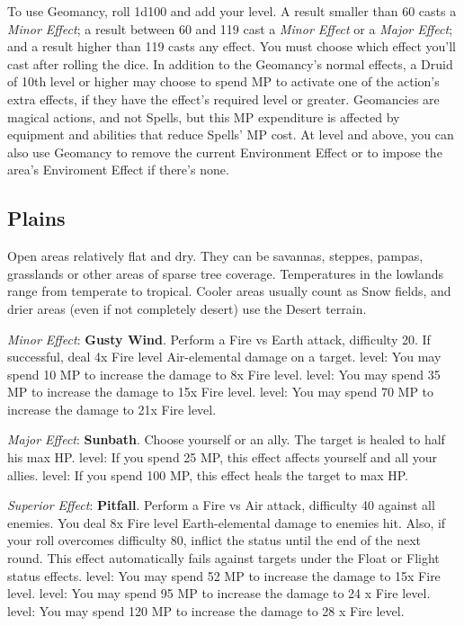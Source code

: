 To use Geomancy, roll 1d100 and add your level. A result smaller than 60 casts a \textit{Minor Effect}; a result between 60 and 119 cast a \textit{Minor Effect} or a \textit{Major Effect}; and a result higher than 119 casts any effect.  You must choose which effect you'll cast after rolling the dice. In addition to the Geomancy’s normal  effects, a Druid of 10th level or higher may choose to spend MP to activate one of the action’s extra effects,  if they have the effect’s required level or greater. Geomancies are magical actions, and not Spells, but this  MP expenditure is affected by equipment and abilities that reduce Spells’ MP cost. At  level and above, you can also use Geomancy to remove the current Environment Effect or to impose the area's Enviroment Effect if there's none.

\begin{multicols}{2}
\subsection*{Plains}\label{subsec:geo-plains}
	
Open areas relatively flat and dry. They can be savannas, steppes, pampas, grasslands or other areas of sparse tree coverage. Temperatures in the  lowlands range from temperate to tropical. Cooler  areas usually count as Snow fields, and drier areas  (even if not completely desert) use the Desert  terrain.

\textit{Minor Effect}: \textbf{Gusty Wind}. Perform a Fire vs Earth attack, difficulty 20. If successful, deal 4x Fire level Air-elemental damage on a target.  level: You may spend 10 MP to increase the damage to 8x Fire level.  level: You may spend 35 MP to increase the damage to 15x Fire level.  level: You may spend 70 MP to increase the damage to 21x Fire level.

\textit{Major Effect}: \textbf{Sunbath}. Choose yourself or an ally. The target is healed to half his max HP\@.  level: If you spend 25 MP, this effect affects yourself and all your allies.  level: If you spend 100 MP, this effect heals the target to max HP\@. %

\textit{Superior Effect}: \textbf{Pitfall}. Perform a Fire vs Air attack, difficulty 40 against all enemies. You deal 8x Fire level Earth-elemental damage to enemies hit. Also, if your roll overcomes difficulty 80, inflict the  status until the end of the next round. This effect automatically fails against targets under the Float or Flight status effects.  level: You may spend 52 MP to increase the damage to 15x Fire level.  level: You may spend 95 MP to increase the damage to 24 x Fire level.  level: You may spend 120 MP to increase the damage to 28 x Fire level.


\end{multicols}
